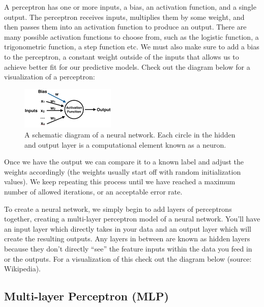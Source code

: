\documentclass[12pt]{article}
\numberwithin{equation}{section}
\numberwithin{table}{section}
\numberwithin{figure}{section}
\begin{document}
A perceptron has one or more inputs, a bias, an activation function, and a single output. The perceptron receives inputs, multiplies them by some weight, and then passes them into an activation function to produce an output. There are many possible activation functions to choose from, such as the logistic function, a trigonometric function, a step function etc. We must also make sure to add a bias to the perceptron, a constant weight outside of the inputs that allows us to achieve better fit for our predictive models. Check out the diagram below for a visualization of a perceptron:

\begin{figure}[H] \centering
	\includegraphics[width=0.4\textwidth]{perceptron.png}
	\caption{A schematic diagram of a neural network. Each circle in the hidden and output layer is a computational element known as a neuron. }
	\label{perceptron}
\end{figure}

Once we have the output we can compare it to a known label and adjust the weights accordingly (the weights usually start off with random initialization values). We keep repeating this process until we have reached a maximum number of allowed iterations, or an acceptable error rate.

To create a neural network, we simply begin to add layers of perceptrons together, creating a multi-layer perceptron model of a neural network. You’ll have an input layer which directly takes in your data and an output layer which will create the resulting outputs. Any layers in between are known as hidden layers because they don’t directly “see” the feature inputs within the data you feed in or the outputs. For a visualization of this check out the diagram below (source: Wikipedia).


\subsection{Multi-layer Perceptron (MLP)} \label{mlp}
\end{document}
